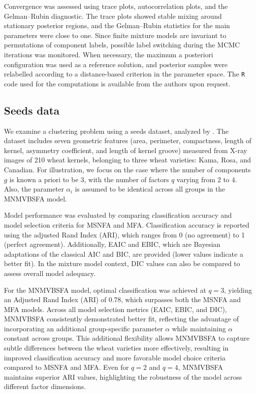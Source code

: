 \documentclass[twoside]{article}
\theoremstyle{definition}
\begin{document}
Convergence was assessed using trace plots, autocorrelation plots, and the Gelman--Rubin diagnostic. The trace plots showed stable mixing around stationary posterior regions, and the Gelman--Rubin statistics for the main parameters were close to one. Since finite mixture models are invariant to permutations of component labels, possible label switching during the MCMC iterations was monitored. When necessary, the maximum a posteriori configuration was used as a reference solution, and posterior samples were relabelled according to a distance-based criterion in the parameter space. The \texttt{R} code used for the computations is available from the authors upon request.
\subsection{Seeds data}
\vspace{-0.5cm}
We examine a clustering problem using a seeds dataset, analyzed by \cite{Lin:2016}. The dataset includes seven geometric features (area, perimeter, compactness, length of kernel, asymmetry coefficient, and length of kernel groove) measured from X-ray images of 210 wheat kernels, belonging to three wheat varieties: Kama, Rosa, and Canadian. For illustration, we focus on the case where the number of components $g$ is known a priori to be 3, with the number of factors $q$ varying from 2 to 4. Also, the parameter $\alpha_i$ is assumed to be identical across all groups in the MNMVBSFA model.

Model performance was evaluated by comparing classification accuracy and model selection criteria for MSNFA and MFA. Classification accuracy is reported using the adjusted Rand Index (ARI), which ranges from 0 (no agreement) to 1 (perfect agreement). Additionally, EAIC and EBIC, which are Bayesian adaptations of the classical AIC and BIC, are provided (lower values indicate a better fit). In the mixture model context, DIC values can also be compared to assess overall model adequacy.

For the MNMVBSFA model, optimal classification was achieved at $q=3$, yielding an Adjusted Rand Index (ARI) of 0.78, which surpasses both the MSNFA and MFA models. Across all model selection metrics (EAIC, EBIC, and DIC), MNMVBSFA consistently demonstrated better fit, reflecting the advantage of incorporating an additional group-specific parameter $\alpha$ while maintaining $\alpha$ constant across groups. This additional flexibility allows MNMVBSFA to capture subtle differences between the wheat varieties more effectively, resulting in improved classification accuracy and more favorable model choice criteria compared to MSNFA and MFA. Even for $q=2$ and $q=4$, MNMVBSFA maintains superior ARI values, highlighting the robustness of the model across different factor dimensions.
\end{document}
